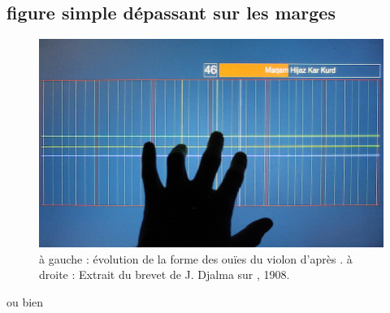 \subsection*{figure simple dépassant sur les marges}

\begin{figure}[!htbp]
	\centerline{
		\includegraphics[width=1.2\textwidth]{gfx/06_visual_representation/mpTUI_pitchgrid_72dpi.png}
	}
	\caption{à gauche : évolution de la forme des ouïes du violon d'après \cite{nia_evolution_2015}. à droite : Extrait du brevet de J. Djalma sur , 1908.}
	\label{fig:sandbox:single}
\end{figure}

ou bien

\begin{center}
\end{center}

